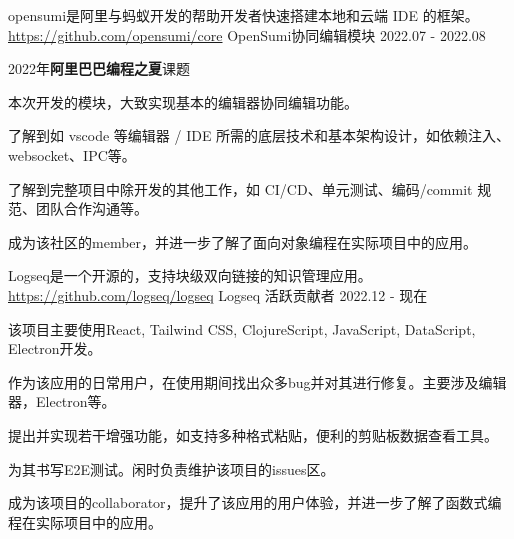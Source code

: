 

\begin{cventries}


\cventry
    {opensumi是阿里与蚂蚁开发的帮助开发者快速搭建本地和云端 IDE 的框架。\href{https://github.com/opensumi/core}{https://github.com/opensumi/core}} %
    {OpenSumi协同编辑模块} %
    {} %
    {2022.07 - 2022.08} %
    {
      \begin{cvitems} %
        \item {2022年\textbf{阿里巴巴编程之夏}课题}
        \item {本次开发的模块，大致实现基本的编辑器协同编辑功能。}
        \item {了解到如 vscode 等编辑器 / IDE 所需的底层技术和基本架构设计，如依赖注入、websocket、IPC等。}
        \item {了解到完整项目中除开发的其他工作，如 CI/CD、单元测试、编码/commit 规范、团队合作沟通等。}
        \item {成为该社区的member，并进一步了解了面向对象编程在实际项目中的应用。}
      \end{cvitems}
    }


\cventry
    {Logseq是一个开源的，支持块级双向链接的知识管理应用。\href{https://github.com/logseq/logseq}{https://github.com/logseq/logseq}} %
    {Logseq 活跃贡献者} %
    {} %
    {2022.12 - 现在} %
    {
      \begin{cvitems} %
        \item {该项目主要使用React, Tailwind CSS, ClojureScript, JavaScript, DataScript, Electron开发。}
        \item {作为该应用的日常用户，在使用期间找出众多bug并对其进行修复。主要涉及编辑器，Electron等。}
        \item {提出并实现若干增强功能，如支持多种格式粘贴，便利的剪贴板数据查看工具。}
        \item {为其书写E2E测试。闲时负责维护该项目的issues区。}
        \item {成为该项目的collaborator，提升了该应用的用户体验，并进一步了解了函数式编程在实际项目中的应用。}
      \end{cvitems}
    }

\end{cventries}
